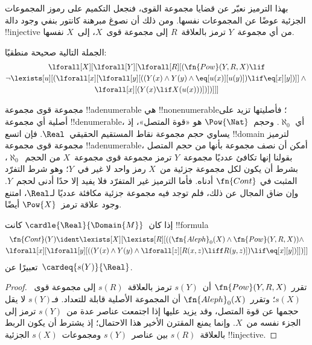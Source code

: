 \documentclass[../../../include/open-logic-section]{subfiles}
\begin{document}
\begin{explain}
بهذا الترميز نعبّر عن قضايا مجموعة القوى، فنجعل التكميم على
رموز المجموعات الجزئية عوضًا عن المجموعات نفسها.
ومن ذلك أن نصوغ مبرهنة كانتور بنفي وجود دالة !!{injective}
من أي مجموعة~$Y$ ترمز بالعلاقة~$R$ إلى مجموعة قوى~$X$، إلى~$X$ نفسها.
\end{explain}

\begin{prop}
الجملة التالية صحيحة منطقيًا:
\begin{multline*}
  \lforall[X][\lforall[Y][\lforall[R][(\fn{Pow}(Y, R, X) \lif \\
      \lnot \lexists[u][(\lforall[x][\lforall[y][((Y(x) \land Y(y) \land
            \eq[u(x)][u(y)]) \lif
            \eq[x][y])]] \land {}\\
        \lforall[x][(Y(x) \lif X(u(x)))])])]]]
\end{multline*}
\end{prop}

\begin{explain}
مجموعة قوى مجموعة !!a{denumerable} هي !!{nonenumerable}؛
فأصليتها تزيد على أصلية أي مجموعة !!{denumerable}، أي
$\aleph_0$. وحجم~$\Pow{\Nat}$ هو «قوة المتصل»، إذ يساوي
حجم مجموعة نقاط المستقيم الحقيقي~$\Real$.
فإن اتسع !!{domain} لترميز مجموعة قوى مجموعة !!a{denumerable}،
  أمكن أن نصف مجموعة بأنها من حجم المتصل بقولنا إنها تكافئ
  عدديًا مجموعة~$Y$ ترمز مجموعة قوى مجموعة~$X$
  من الحجم~$\aleph_0$، بشرط أن يكون لكل مجموعة جزئية من~$X$
  رمز واحد لا غير في~$Y$؛ وهو شرط التفرّد المثبت في
  \(\fn{Cont}\) أدناه. فأما الترميز غير المتفرّد فلا يفيد إلا
  حدًا أدنى لحجم~$Y$. وإن ضاق المجال عن ذلك، فلم توجد
فيه مجموعة جزئية مكافئة عدديًا لـ$\Real$، امتنع وجود علاقة
  ترمز~$\Pow{X}$ أيضًا.
\end{explain}

\begin{prop}
إذا كان~$\cardle{\Real}{\Domain{M}}$ كانت !!{formula}
\begin{multline*}
\fn{Cont}(Y) \ident 
\lexists[X][\lexists[R][((\fn{Aleph}_0(X) \land
      \fn{Pow}(Y, R, X)) \land \\ 
      \lforall[x][\lforall[y][((Y(x) \land {} 
      Y(y) \land \lforall[z][R(x,z) \liff R(y,z)]) \lif \eq[x][y])]])]]
\end{multline*}
تعبيرًا عن~$\cardeq{s(Y)}{\Real}$.
\end{prop}

\begin{proof}
تقرر~$\fn{Pow}(Y, R, X)$ أن~$s(Y)$ ترمز
بالعلاقة~$s(R)$ إلى مجموعة قوى~$s(X)$؛
وتقرر~$\fn{Aleph}_0(X)$ أن المجموعة الأصلية قابلة للتعداد.
فـ$s(Y)$ لا يقل حجمها عن قوة المتصل، وقد يزيد عليها إذا
اجتمعت عناصر عدة من~$s(Y)$ ترمز إلى الجزء نفسه من~$X$.
وإنما يمنع المقترن الأخير هذا الاحتمال؛ إذ يشترط أن يكون الربط
بالعلاقة~$s(R)$ بين عناصر~$s(Y)$ ومجموعات~$s(X)$ الجزئية
!!{injective}.
\end{proof}
\end{document}
